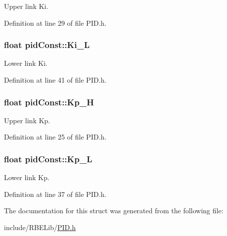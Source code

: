 Upper link Ki. 



Definition at line 29 of file P\-I\-D.\-h.

\hypertarget{structpid_const_a073fd5fd7eccdab0c8c7d5ad15bcb4c0}{
\subsubsection[{Ki\-\_\-\-L}]{\setlength{\rightskip}{0pt plus 5cm}float pid\-Const\-::\-Ki\-\_\-\-L}}\label{structpid_const_a073fd5fd7eccdab0c8c7d5ad15bcb4c0}


Lower link Ki. 



Definition at line 41 of file P\-I\-D.\-h.

\hypertarget{structpid_const_ae2c7d62f4fd919c89233a39e1a84b2db}{
\subsubsection[{Kp\-\_\-\-H}]{\setlength{\rightskip}{0pt plus 5cm}float pid\-Const\-::\-Kp\-\_\-\-H}}\label{structpid_const_ae2c7d62f4fd919c89233a39e1a84b2db}


Upper link Kp. 



Definition at line 25 of file P\-I\-D.\-h.

\hypertarget{structpid_const_a0e30018aca6e06a3c00d16b39f3f0133}{
\subsubsection[{Kp\-\_\-\-L}]{\setlength{\rightskip}{0pt plus 5cm}float pid\-Const\-::\-Kp\-\_\-\-L}}\label{structpid_const_a0e30018aca6e06a3c00d16b39f3f0133}


Lower link Kp. 



Definition at line 37 of file P\-I\-D.\-h.



The documentation for this struct was generated from the following file\-:\begin{DoxyCompactItemize}
\item 
include/\-R\-B\-E\-Lib/\hyperlink{_p_i_d_8h}{P\-I\-D.\-h}\end{DoxyCompactItemize}
